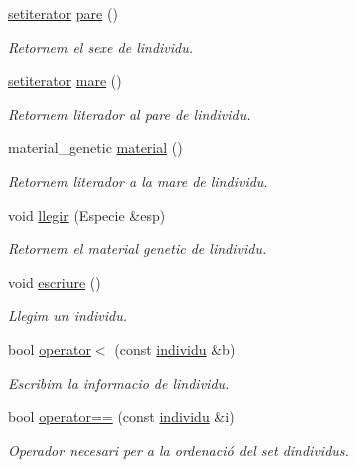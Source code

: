 \begin{DoxyCompactItemize}
\hyperlink{individu_8hh_a32dbccbf05588c8c12b0111d5c5c6eb3}{setiterator} \hyperlink{classindividu_a6f379a03c06d9c39c47b20fa4b1a899b}{pare} ()
\begin{DoxyCompactList}\small\item\em Retornem el sexe de l\textquotesingle{}individu. \end{DoxyCompactList}\item 
\hyperlink{individu_8hh_a32dbccbf05588c8c12b0111d5c5c6eb3}{setiterator} \hyperlink{classindividu_a8f1a09977b42f186fae0955ce7ef683e}{mare} ()
\begin{DoxyCompactList}\small\item\em Retornem l\textquotesingle{}iterador al pare de l\textquotesingle{}individu. \end{DoxyCompactList}\item 
material\+\_\+genetic \hyperlink{classindividu_a89c30a9e1a39e5860f4c9cd421b033d7}{material} ()
\begin{DoxyCompactList}\small\item\em Retornem l\textquotesingle{}iterador a la mare de l\textquotesingle{}individu. \end{DoxyCompactList}\item 
void \hyperlink{classindividu_a309eb865a39352302fd8d97cf67584bb}{llegir} (Especie \&esp)
\begin{DoxyCompactList}\small\item\em Retornem el material genetic de l\textquotesingle{}individu. \end{DoxyCompactList}\item 
void \hyperlink{classindividu_a88659e52840409422fc354b513ca03a8}{escriure} ()
\begin{DoxyCompactList}\small\item\em Llegim un individu. \end{DoxyCompactList}\item 
bool \hyperlink{classindividu_aaea7fcb4f4fbb4f1415ad6106956627d}{operator$<$} (const \hyperlink{classindividu}{individu} \&b)
\begin{DoxyCompactList}\small\item\em Escribim la informacio de l\textquotesingle{}individu. \end{DoxyCompactList}\item 
bool \hyperlink{classindividu_aca6c8ae3ac8b3db283f800dbde0d4eb4}{operator==} (const \hyperlink{classindividu}{individu} \&i)
\begin{DoxyCompactList}\small\item\em Operador necesari per a la ordenació del set d\textquotesingle{}individus. \end{DoxyCompactList}\end{DoxyCompactItemize}


